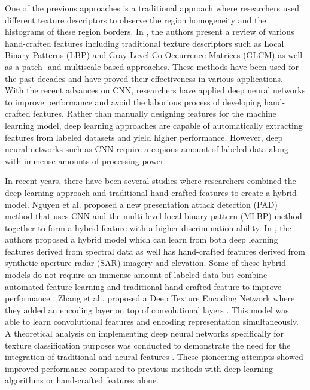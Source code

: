 \documentclass[10pt,twocolumn,letterpaper]{article}
\begin{document}
 One of the previous approaches is a traditional approach where researchers used different texture descriptors to observe the region homogeneity and the histograms of these region borders. In \cite{Basu2018deeptexture}, the authors present a review of various hand-crafted features including traditional texture descriptors such as Local Binary Patterns (LBP) \cite{Ojala2002lbp} and Gray-Level Co-Occurrence Matrices (GLCM) \cite{Haralick1973GLCM} as well as a patch- and multiscale-based approaches. These methods have been used for the past decades and have proved their effectiveness in various applications. 
 \\
 
 With the recent advances on CNN, researchers have applied deep neural networks to improve performance and avoid the laborious process of developing hand-crafted features. Rather than manually designing features for the machine learning model, deep learning approaches are capable of automatically extracting features from labeled datasets and yield higher performance. However, deep neural networks such as CNN require a copious amount of labeled data along with immense amounts of processing power.
 

 
In recent years, there have been several studies where researchers combined the deep learning approach and traditional hand-crafted features to create a hybrid model. 
Nguyen et al. \cite{Nguyen2018Face} proposed a new presentation attack detection (PAD) method that uses CNN and the multi-level local binary pattern (MLBP) method together to form a hybrid feature with a higher discrimination ability. In \cite{Nijhawan2019snowmap}, the authors proposed a hybrid model which can learn from both deep learning features derived from spectral data as well has hand-crafted features derived from synthetic aperture radar (SAR) imagery and elevation. Some of these hybrid models do not require an immense amount of labeled data but combine automated feature learning and traditional hand-crafted feature to improve performance \cite{Nijhawan2019snowmap}. 
Zhang et al., proposed a Deep Texture Encoding Network where they added an encoding layer on top of convolutional layers \cite{Zhang2016ten}. This model was able to learn convolutional features and encoding representation simultaneously. A theoretical analysis on implementing deep neural networks specifically for texture classification purposes was conducted to demonstrate the need for the integration of traditional and neural features \cite{Basu2018deeptexture}. These pioneering attempts showed improved performance compared to previous methods with deep learning algorithms or hand-crafted features alone. \\
\end{document}
